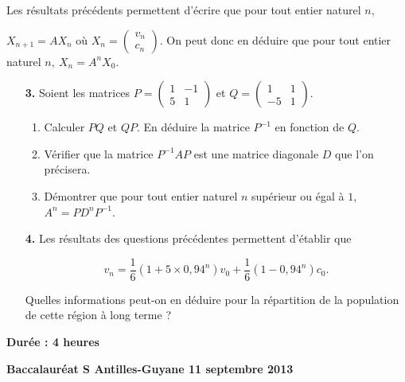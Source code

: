 \documentclass[10pt]{article}
\begin{document}
Les résultats précédents permettent d'écrire que pour tout entier naturel $n$, 

$X_{n+1} = AX_{n}$ où $X_{n} = \begin{pmatrix}v_{n}\\c_{n}\end{pmatrix}$. On peut donc en déduire que pour tout entier naturel $n,\: X_{n} = A^n X_{0}$. 

\medskip

\begin{enumerate}
\item[\textbf{3.}] Soient les matrices $P = \begin{pmatrix}1&- 1\\5&1\end{pmatrix}$ et $Q = \begin{pmatrix}1&1\\- 5&1\end{pmatrix}$. 
	\begin{enumerate}
		\item Calculer $PQ$ et $QP$. En déduire la matrice $P^{-1}$ en fonction de $Q$. 
		\item Vérifier que la matrice $P^{-1}AP$ est une matrice diagonale $D$ que l'on précisera. 
		\item Démontrer que pour tout entier naturel $n$ supérieur ou égal à $1$, $A^n = P D^n P^{- 1}$.
	\end{enumerate} 
\item[\textbf{4.}] Les résultats des questions précédentes permettent d'établir que 
 
\[v_{n} = \dfrac{1}{6}\left(1 + 5 \times  0,94^n\right)v_{0} + \dfrac{1}{6}\left(1 - 0,94^n\right)c_{0}.\] 

Quelles informations peut-on en déduire pour la répartition de la population de cette région à long terme ? 
\end{enumerate}
\newpage
\hypertarget{Antillessep}{}

\renewcommand \footrulewidth{.2pt}
\pagestyle{fancy}
\thispagestyle{empty}
\begin{center}\textbf{Durée : 4 heures}

\vspace{0,25cm}

{\Large\textbf{Baccalauréat S Antilles-Guyane 11 septembre 2013}}
\end{center}
\end{document}
